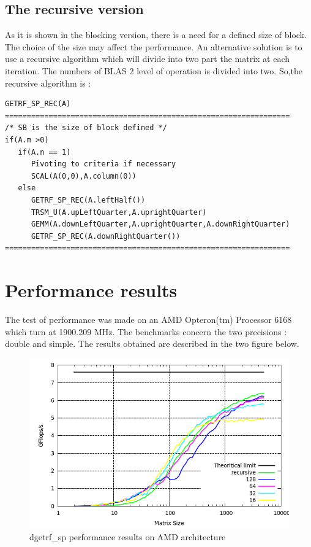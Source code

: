 \documentclass{report}
\begin{document}
\subsection{The recursive version}
As it is shown in the blocking version, there is a need for a defined size of block. The choice of the size may affect the performance. An alternative solution is to use a recursive algorithm which will divide into two part the matrix at each iteration. The numbers of BLAS 2 level of operation is divided into two. So,the recursive algorithm is :

\begin{verbatim}
GETRF_SP_REC(A)
=================================================================
/* SB is the size of block defined */
if(A.m >0)
   if(A.n == 1)
      Pivoting to criteria if necessary
      SCAL(A(0,0),A.column(0))
   else
      GETRF_SP_REC(A.leftHalf())
      TRSM_U(A.upLeftQuarter,A.uprightQuarter)
      GEMM(A.downLeftQuarter,A.uprightQuarter,A.downRightQuarter)
      GETRF_SP_REC(A.downRightQuarter())
=================================================================
\end{verbatim}


\section{Performance results}
The test of performance was made on an AMD Opteron(tm) Processor 6168
which turn at 1900.209 MHz. The benchmarks concern the two precisions : double and simple. The results obtained are described in the two figure below.
\begin{figure}[!h]
\begin{center}
\includegraphics[width=\textwidth]{exp_dgetrf_sp_amd.png} 
\end{center}
\caption{dgetrf\_sp performance results on AMD architecture}
\end{figure}
\end{document}
